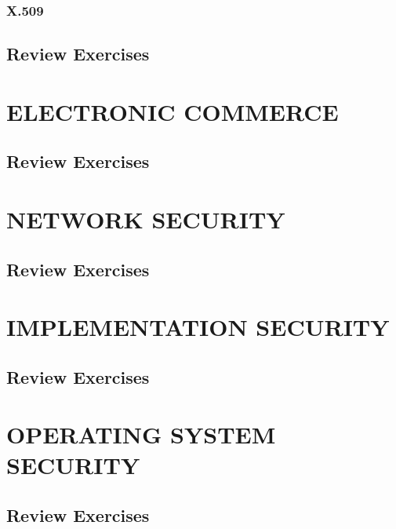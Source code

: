 \documentclass[a4paper, 10 pt, conference]{ieeeconf}
\begin{document}
\subsubsection{\textbf{X.509}}



\subsection{\textbf{Review Exercises}}






\section{\textbf{ELECTRONIC COMMERCE}}
\subsection{\textbf{Review Exercises}}






\section{\textbf{NETWORK SECURITY}}
\subsection{\textbf{Review Exercises}}






\section{\textbf{IMPLEMENTATION SECURITY}}
\subsection{\textbf{Review Exercises}}






\section{\textbf{OPERATING SYSTEM SECURITY}}
\subsection{\textbf{Review Exercises}}
\end{document}
